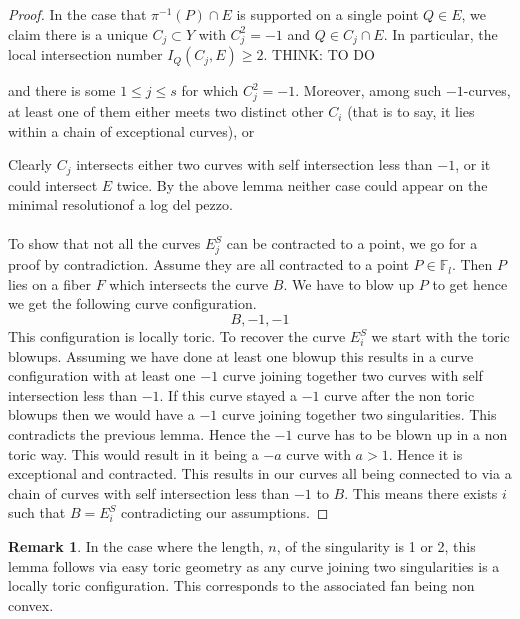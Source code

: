 \documentclass[11pt]{report}
\theoremstyle{definition}
\theoremstyle{definition}
\theoremstyle{definition}
\theoremstyle{definition}
\theoremstyle{definition}
\theoremstyle{definition}
\theoremstyle{definition}
\theoremstyle{definition}
\newtheorem*{rem}{Remark}
\newcommand{\ldp}{log del pezzo}
\newcommand{\mb}[1]{\mathbb{#1}}
\newcommand{\minres}{minimal resolution}
\begin{document}
\begin{proof}
In the case that $\pi^{-1}(P)\cap E$ is supported on a single point $Q\in E$, we claim
there is a unique $C_j\subset Y$ with $C_j^2=-1$ and $Q\in C_j\cap E$. In particular,
the local intersection number $I_Q(C_j,E)\ge 2$.   THINK: TO DO


 and there is some $1\le j\le s$ for which
 $C_j^2 = -1$. Moreover, among such $-1$-curves, at least one of them either
 meets two distinct other $C_i$ (that is to say, it lies within a chain of exceptional curves),
or 
 
 
 Clearly $C_j$ intersects either two curves with self intersection less than $-1$, or it could intersect $E$ twice. By the above lemma neither case could appear on the \minres of a \ldp.
\\
\\
To show that not all the curves $E_j^S$ can be contracted to a point, we go for a proof by contradiction. Assume they are all contracted to a point $P \in \mb{F}_l$. Then $P$ lies on a fiber $F$ which intersects the curve $B$. We have to blow up $P$ to get hence we get the following curve configuration. 
\[
B, -1, -1
\]
This configuration is locally toric. To recover the curve $E_i^S$ we  start with the toric blowups. Assuming we have done at least one blowup this results in a curve configuration with at least one $-1$ curve joining together two curves with self intersection less than $-1$. If this curve stayed a $-1$ curve after the non toric blowups then we would have a $-1$ curve joining together two singularities. This contradicts the previous lemma. Hence the $-1$ curve has to be blown up in a non toric way. This would result in it being a $-a$ curve with $a>1$. Hence it is exceptional and contracted. This results in our curves all being connected to via a chain of curves  with self intersection less than $-1$ to $B$. This means there exists $i$ such that $B = E_i^S$ contradicting our assumptions.
\end{proof}

\begin{rem}
In the case where the length, $n$, of the singularity is 1 or 2, this lemma follows via easy toric geometry as any curve joining two singularities is a locally toric configuration. This corresponds to the associated fan being non convex. 
\end{rem}
\end{document}
